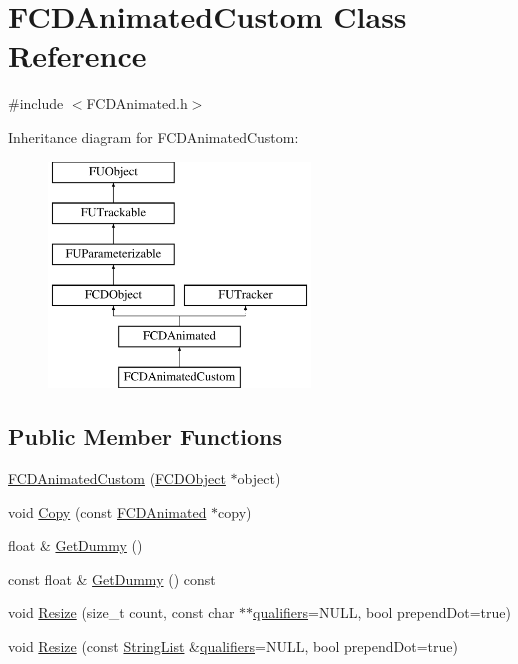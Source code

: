 \hypertarget{classFCDAnimatedCustom}{
\section{FCDAnimatedCustom Class Reference}
\label{classFCDAnimatedCustom}
}


{\ttfamily \#include $<$FCDAnimated.h$>$}

Inheritance diagram for FCDAnimatedCustom:\begin{figure}[H]
\begin{center}
\leavevmode
\includegraphics[height=6.000000cm]{classFCDAnimatedCustom}
\end{center}
\end{figure}
\subsection*{Public Member Functions}
\begin{DoxyCompactItemize}
\item 
\hyperlink{classFCDAnimatedCustom_a4e15071aff5b34b08ca8c39754331225}{FCDAnimatedCustom} (\hyperlink{classFCDObject}{FCDObject} $\ast$object)
\item 
void \hyperlink{classFCDAnimatedCustom_a2e53d1c7918e81312d507e6c196e778f}{Copy} (const \hyperlink{classFCDAnimated}{FCDAnimated} $\ast$copy)
\item 
float \& \hyperlink{classFCDAnimatedCustom_ac23677b9bcc764c90c2a2256c2665c6b}{GetDummy} ()
\item 
const float \& \hyperlink{classFCDAnimatedCustom_ae2e70908717bea35adcb50162066ee97}{GetDummy} () const 
\item 
void \hyperlink{classFCDAnimatedCustom_a22c9c44059742d2571f5d9bacf7c39ed}{Resize} (size\_\-t count, const char $\ast$$\ast$\hyperlink{classFCDAnimated_a02ab9175d25055cd2d10d924de312490}{qualifiers}=NULL, bool prependDot=true)
\item 
void \hyperlink{classFCDAnimatedCustom_ad231a2f2902a351b29a171b3540823d9}{Resize} (const \hyperlink{classfm_1_1vector}{StringList} \&\hyperlink{classFCDAnimated_a02ab9175d25055cd2d10d924de312490}{qualifiers}=NULL, bool prependDot=true)
\end{DoxyCompactItemize}


